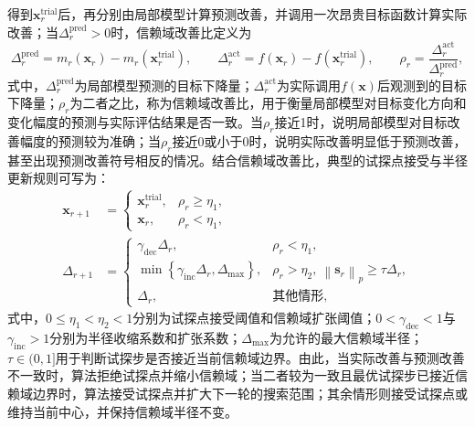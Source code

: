 得到$\bm{x}_{r}^{\mathrm{trial}}$后，再分别由局部模型计算预测改善，并调用一次昂贵目标函数计算实际改善；当$\Delta_{r}^{\mathrm{pred}}>0$时，信赖域改善比定义为
\begin{equation}
\Delta_{r}^{\mathrm{pred}}
=m_{r}\left(\bm{x}_{r}\right)
-m_{r}\left(\bm{x}_{r}^{\mathrm{trial}}\right),
\qquad
\Delta_{r}^{\mathrm{act}}
=f\left(\bm{x}_{r}\right)
-f\left(\bm{x}_{r}^{\mathrm{trial}}\right),
\qquad
\rho_{r}
=\frac{\Delta_{r}^{\mathrm{act}}}
{\Delta_{r}^{\mathrm{pred}}},
\label{eq.opt.classicalratio}
\end{equation}
式中，$\Delta_{r}^{\mathrm{pred}}$为局部模型预测的目标下降量；$\Delta_{r}^{\mathrm{act}}$为实际调用$f(\bm{x})$后观测到的目标下降量；$\rho_{r}$为二者之比，称为信赖域改善比，用于衡量局部模型对目标变化方向和变化幅度的预测与实际评估结果是否一致。当$\rho_r$接近1时，说明局部模型对目标改善幅度的预测较为准确；当$\rho_r$接近0或小于0时，说明实际改善明显低于预测改善，甚至出现预测改善符号相反的情况。结合信赖域改善比，典型的试探点接受与半径更新规则可写为：
\begin{equation}
\begin{aligned}
\bm{x}_{r+1}
&=
\begin{cases}
\bm{x}_{r}^{\mathrm{trial}},
&\rho_{r}\geq\eta_{1},\\
\bm{x}_{r},
&\rho_{r}<\eta_{1},
\end{cases}\\
\Delta_{r+1}
&=
\begin{cases}
\gamma_{\mathrm{dec}}\Delta_{r},
&\rho_{r}<\eta_{1},\\
\min\!\left\{\gamma_{\mathrm{inc}}\Delta_{r},\Delta_{\max}\right\},
&\rho_{r}>\eta_{2},\
\left\|\bm{s}_{r}\right\|_{p}\geq\tau\Delta_{r},\\
\Delta_{r},
&\text{其他情形},
\end{cases}
\end{aligned}
\label{eq.opt.classicalupdate}
\end{equation}
式中，$0\leq\eta_{1}<\eta_{2}<1$分别为试探点接受阈值和信赖域扩张阈值；$0<\gamma_{\mathrm{dec}}<1$与$\gamma_{\mathrm{inc}}>1$分别为半径收缩系数和扩张系数；$\Delta_{\max}$为允许的最大信赖域半径；$\tau\in(0,1]$用于判断试探步是否接近当前信赖域边界。由此，当实际改善与预测改善不一致时，算法拒绝试探点并缩小信赖域；当二者较为一致且最优试探步已接近信赖域边界时，算法接受试探点并扩大下一轮的搜索范围；其余情形则接受试探点或维持当前中心，并保持信赖域半径不变。

